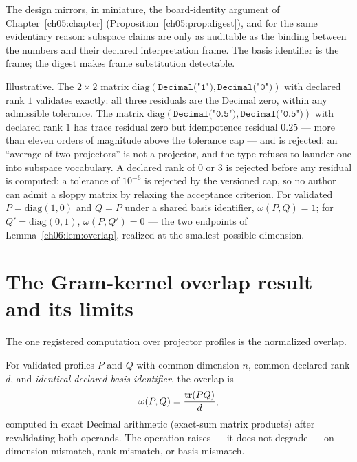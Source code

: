 The design mirrors, in miniature, the board-identity argument of
Chapter~\ref{ch05:chapter} (Proposition~\ref{ch05:prop:digest}), and
for the same evidentiary reason: subspace claims are only as auditable
as the binding between the numbers and their declared interpretation
frame. The basis identifier is the frame; the digest makes frame
substitution detectable.

\begin{example}
\label{ch06:ex:projector}
Illustrative. The $2 \times 2$ matrix
$\mathrm{diag}(\texttt{Decimal("1")}, \texttt{Decimal("0")})$ with
declared rank $1$ validates exactly: all three residuals are the
Decimal zero, within any admissible tolerance. The matrix
$\mathrm{diag}(\texttt{Decimal("0.5")}, \texttt{Decimal("0.5")})$ with
declared rank $1$ has trace residual zero but idempotence residual
$0.25$ --- more than eleven orders of magnitude above the tolerance cap --- and
is rejected: an ``average of two projectors'' is not a projector, and
the type refuses to launder one into subspace vocabulary. A declared
rank of $0$ or $3$ is rejected before any residual is computed; a
tolerance of $10^{-6}$ is rejected by the versioned cap, so no author
can admit a sloppy matrix by relaxing the acceptance criterion.
For validated $P = \mathrm{diag}(1, 0)$ and $Q = P$ under a shared
basis identifier, $\omega(P, Q) = 1$; for $Q' = \mathrm{diag}(0, 1)$,
$\omega(P, Q') = 0$ --- the two endpoints of
Lemma~\ref{ch06:lem:overlap}, realized at the smallest possible
dimension.
\end{example}

\section{The Gram-kernel overlap result and its limits}
\label{ch06:sec:gram}

The one registered computation over projector profiles is the
normalized overlap.

\begin{definition}\label{ch06:def:overlap}
For validated profiles $P$ and $Q$ with common dimension $n$, common
declared rank $d$, and \emph{identical declared basis identifier}, the
overlap is
\[
\omega(P, Q) = \frac{\mathrm{tr}(PQ)}{d},
\]
computed in exact Decimal arithmetic (exact-sum matrix products) after
revalidating both operands. The operation raises --- it does not
degrade --- on dimension mismatch, rank mismatch, or basis mismatch.
\end{definition}

